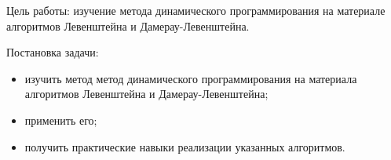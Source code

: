 \Introduction

Цель работы: изучение метода динамического программирования на материале
алгоритмов  Левенштейна и Дамерау-Левенштейна.

Постановка задачи:

\begin{itemize}
\item изучить метод метод динамического программирования на материала алгоритмов Левенштейна и Дамерау-Левенштейна;
\item применить его;
\item получить практические навыки реализации указанных алгоритмов.
\end{itemize}


